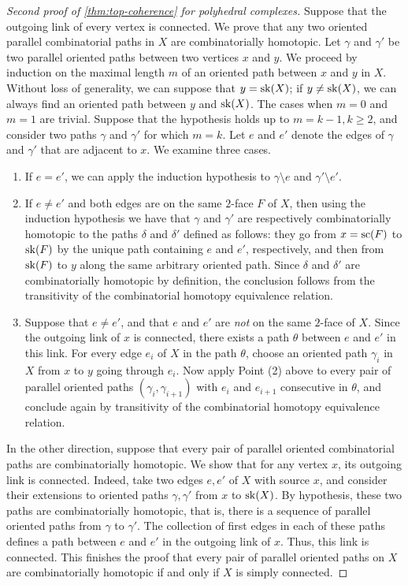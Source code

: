 \begin{proof}[Second proof of {\cref{thm:top-coherence}} for polyhedral complexes]
    Suppose that the outgoing link of every vertex is connected. 
    We prove that any two oriented parallel combinatorial paths in $X$ are combinatorially homotopic. 
    Let $\gamma$ and $\gamma'$ be two parallel oriented paths between two vertices $x$ and $y$. 
    We proceed by induction on the maximal length $m$ of an oriented path between $x$ and $y$ in $X$. 
    Without loss of generality, we can suppose that $y=\mathrm{sk}(X)$; if $y\neq\mathrm{sk}(X)$, we can always find an oriented path between $y$ and $\mathrm{sk}(X)$.
    The cases when $m=0$ and $m=1$ are trivial. 
    Suppose that the hypothesis holds up to $m=k-1, k\geq 2$, and consider two paths $\gamma$ and $\gamma'$ for which $m=k$. 
    Let $e$ and $e'$ denote the edges of $\gamma$ and $\gamma'$ that are adjacent to $x$. 
    We examine three cases.
    \begin{enumerate}
        \item If $e=e'$, we can apply the induction hypothesis to $\gamma \setminus e$ and $\gamma' \setminus e'$. 
        \item If $e \neq e'$ and both edges are on the same $2$-face $F$ of $X$, then using the induction hypothesis we have that $\gamma$ and $\gamma'$ are respectively combinatorially homotopic to the paths $\delta$ and $\delta'$ defined as follows: they go from $x=\mathrm{sc}(F)$ to $\mathrm{sk}(F)$ by the unique path containing $e$ and $e'$, respectively, and then from $\mathrm{sk}(F)$ to $y$ along the same arbitrary oriented path. 
        Since $\delta$ and $\delta'$ are combinatorially homotopic by definition, the conclusion follows from the transitivity of the combinatorial homotopy equivalence relation. 
        \item Suppose that $e\neq e'$, and that $e$ and $e'$ are \emph{not} on the same $2$-face of $X$. 
        Since the outgoing link of $x$ is connected, there exists a path $\theta$ between $e$ and $e'$ in this link. 
        For every edge $e_i$ of $X$ in the path $\theta$, choose an oriented path $\gamma_i$ in $X$ from $x$ to $y$ going through $e_i$. 
        Now apply Point (2) above to every pair of parallel oriented paths $(\gamma_i, \gamma_{i+1})$ with $e_i$ and $e_{i+1}$ consecutive in $\theta$, and conclude again by transitivity of the combinatorial homotopy equivalence relation. 
    \end{enumerate}

    In the other direction, suppose that every pair of parallel oriented combinatorial paths are combinatorially homotopic. 
    We show that for any vertex $x$, its outgoing link is connected. 
    Indeed, take two edges $e,e'$ of $X$ with source $x$, and consider their extensions to oriented paths $\gamma, \gamma'$ from $x$ to $\mathrm{sk}(X)$. 
    By hypothesis, these two paths are combinatorially homotopic, that is, there is a sequence of parallel oriented paths from $\gamma$ to $\gamma'$. 
    The collection of first edges in each of these paths defines a path between $e$ and $e'$ in the outgoing link of $x$. 
    Thus, this link is connected. 
    This finishes the proof that every pair of parallel oriented paths on $X$ are combinatorially homotopic if and only if $X$ is simply connected.


\end{proof}
